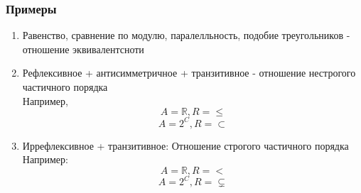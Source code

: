 \documentclass[11pt, oneside]{article}   	%
\begin{document}
        \subsubsection{Примеры}
            \begin{enumerate}
                \item Равенство, сравнение по модулю, паралелльность, подобие треугольников - отношение эквивалентсноти
                \item Рефлексивное + антисимметричное + транзитивное - отношение нестрогого частичного порядка\\
                Например, 
                \[A=\mathbb{R}, R = \le\]
                \[A=2^C,  R = \subset\]
                \item Иррефлексивное + транзитивное: Отношение строгого частичного порядка\\
                    Например: 
                    \[A=\mathbb{R}, R = <\]
                    \[A=2^C, R = \subsetneq\] 
            \end{enumerate}  
\end{document}
